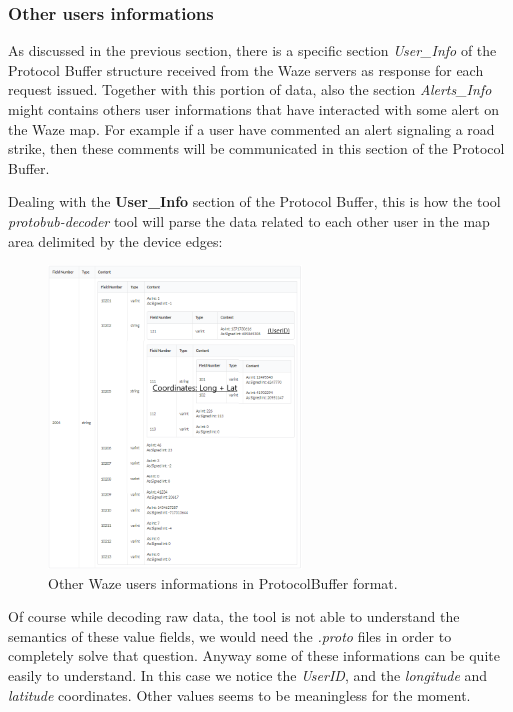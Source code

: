 		\subsubsection{Other users informations}
			\par As discussed in the previous section, there is a specific section \textit{User\_Info} of the Protocol Buffer structure received from the Waze servers as response for each request issued. Together with this portion of data, also the section \textit{Alerts\_Info} might contains others user informations that have interacted with some alert on the Waze map. For example if a user have commented an alert signaling a road strike, then these comments will be communicated in this section of the Protocol Buffer.\newline
			\par Dealing with the \textbf{User\_Info} section of the Protocol Buffer, this is how the tool \textit{protobub-decoder} tool will parse the data related to each other user in the map area delimited by the device edges:
			\begin{figure}[H]
				\centering
				\includegraphics[width=0.6\textwidth]{images/waze_userinfo.png}
				\caption{Other Waze users informations in ProtocolBuffer format.}
			\end{figure}
			Of course while decoding raw data, the tool is not able to understand the semantics of these value fields, we would need the \textit{.proto} files in order to completely solve that question. Anyway some of these informations can be quite easily to understand. In this case we notice the \textit{UserID}, and the \textit{longitude} and \textit{latitude} coordinates. Other values seems to be meaningless for the moment.
			
